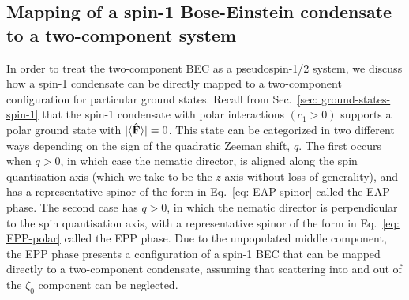 \subsection{Mapping of a spin-1 Bose-Einstein condensate to a two-component
system}
In order to treat the two-component BEC as a pseudospin-1/2 system, we discuss
how a spin-1 condensate can be directly mapped to a two-component configuration
for particular ground states.
Recall from Sec.~\ref{sec: ground-states-spin-1} that the spin-1 condensate
with polar interactions \((c_1 > 0)\) supports a polar ground state with
\(|\langle \hat{\vb{F}} \rangle |=0\).
This state can be categorized in two different ways depending on the sign of the
quadratic Zeeman shift, \(q\).
The first occurs when \(q > 0\), in which case the nematic director, is aligned
along the spin quantisation axis (which we take to be the \(z\)-axis without
loss of generality), and has a representative spinor of the
form in Eq.~\eqref{eq: EAP-spinor} called the EAP phase.
The second case has \(q > 0\), in which the nematic director is perpendicular to
the spin quantisation axis, with a representative spinor of the form in
Eq.~\eqref{eq: EPP-polar} called the EPP phase.
Due to the unpopulated middle component, the EPP phase presents a configuration
of a spin-1 BEC that can be mapped directly to a two-component condensate,
assuming that scattering into and out of the \(\zeta_0\) component can be
neglected.

